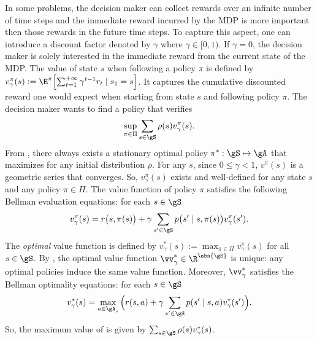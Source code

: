 In some problems, the decision maker can collect rewards over an infinite number of time steps and the immediate reward incurred by the MDP is more important then those rewards in the future time steps.
To capture this aspect, one can introduce a discount factor denoted by $\gamma$ where $\gamma\in[0,1)$.
If $\gamma=0$, the decision maker is solely interested in the immediate reward from the current state of the MDP.
The value of state $s$ when following a policy $\pi$ is defined by $v^\pi_{\gamma}(s):=\E^\pi\Bigl[\sum_{t=1}^{+\infty} \gamma^{t-1}r_t \mid s_1=s\Bigr]$.
It captures the cumulative discounted reward one would expect when starting from state $s$ and following policy $\pi$.
The decision maker wants to find a policy that verifies
\begin{equation}
    \label{eq:discount_obj}
    \sup_{\pi\in\Pi}\sum_{s\in\gS}\rho(s)v^\pi_{\gamma}(s).
\end{equation}
From \cite[Chapter~6]{puterman2014markov}, there always exists a stationary optimal policy $\pi^*:\gS\mapsto\gA$ that maximizes  for any initial distribution $\rho$.
For any $s$, since $0\le\gamma<1$, $v^\pi(s)$ is a geometric series that converges.
So, $v^\pi_\gamma(s)$ exists and well-defined for any state $s$ and any policy $\pi\in\Pi$.
The value function of policy $\pi$ satisfies the following Bellman evaluation equations: for each $s\in\gS$
\begin{equation}
    \label{eq:discount_be_eval}
    v^\pi_\gamma(s) =r\bigl(s,\pi(s)\bigr) +\gamma\sum_{s'\in\gS}p\bigl(s'\mid s,\pi(s)\bigr)v^\pi_\gamma(s').
\end{equation}
The \emph{optimal} value function is defined by $v^*_\gamma(s):=\max_{\pi\in\Pi}v^\pi_\gamma(s)$ for all $s\in\gS$.
By \cite[Theorem~6.2.5]{puterman2014markov}, the optimal value function $\vv^*_\gamma\in\R^{\abs{\gS}}$ is unique: any optimal policies induce the same value function.
Moreover, $\vv^*_\gamma$ satisfies the Bellman optimality equations: for each $s\in\gS$
\begin{equation}
    \label{eq:discount_be_opt}
     v^*_\gamma(s)= \max_{a\in\gA_s}\Big(r(s, a) +\gamma\sum_{s'\in\gS}p(s'\mid s,a)v^*_\gamma(s')\Big).
\end{equation}
So, the maximum value of  is given by $\sum_{s\in\gS}\rho(s)v^*_\gamma(s)$.

